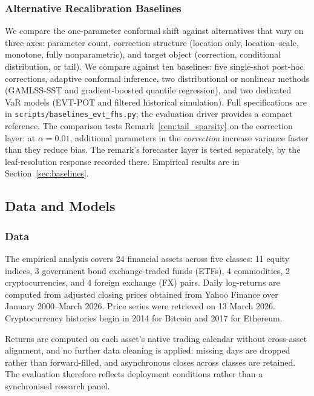 \documentclass[preprint,11pt,authoryear]{elsarticle}
\newcommand{\1}{\boldsymbol{1}}
\begin{document}
\subsubsection{Alternative Recalibration Baselines}
\label{sec:alternatives}

We compare the one-parameter conformal shift against alternatives that vary on three axes: parameter count, correction structure (location only, location--scale, monotone, fully nonparametric), and target object (correction, conditional distribution, or tail). We compare against ten baselines: five single-shot post-hoc corrections, adaptive conformal inference, two distributional or nonlinear methods (GAMLSS-SST and gradient-boosted quantile regression), and two dedicated VaR models (EVT-POT and filtered historical simulation). Full specifications are in \texttt{scripts/baselines\_evt\_fhs.py}; the evaluation driver provides a compact reference. The comparison tests Remark~\ref{rem:tail_sparsity} on the correction layer: at $\alpha = 0.01$, additional parameters in the \emph{correction} increase variance faster than they reduce bias. The remark's forecaster layer is tested separately, by the leaf-resolution response recorded there. Empirical results are in Section~\ref{sec:baselines}.
\subsection{Data and Models}
\label{sec:data_models}

\subsubsection{Data}
\label{sec:data}

The empirical analysis covers 24 financial assets across five classes: 11 equity indices, 3 government bond exchange-traded funds (ETFs), 4 commodities, 2 cryptocurrencies, and 4 foreign exchange (FX) pairs. Daily log-returns are computed from adjusted closing prices obtained from Yahoo Finance over January 2000--March 2026. Price series were retrieved on 13 March 2026. Cryptocurrency histories begin in 2014 for Bitcoin and 2017 for Ethereum.

Returns are computed on each asset's native trading calendar without cross-asset alignment, and no further data cleaning is applied: missing days are dropped rather than forward-filled, and asynchronous closes across classes are retained. The evaluation therefore reflects deployment conditions rather than a synchronised research panel.
\end{document}
